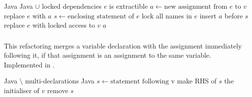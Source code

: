 \begin{algorithm}[p]
\caption{$\refactoring{Extract Assignment}(v : \type{LocalVar}, e : \type{Expr}) : \type{Assignment}$}
\label{alg:ExtractAssignment}
\begin{algorithmic}[1]
\REQUIRE Java
\ENSURE Java $\cup$ locked dependencies
\medskip
\STATE \assert $e$ is extractible
\STATE $a \leftarrow \text{new assignment from $e$ to $v$}$
  \STATE replace $e$ with $a$
\ELSE
  \STATE $s \leftarrow \text{enclosing statement of $e$}$
  \STATE lock all names in $e$
  \STATE insert $a$ before $s$
  \STATE replace $e$ with locked access to $v$
\ENDIF
\RETURN $a$
\end{algorithmic}
\end{algorithm}

\subsubsection{}
This refactoring merges a variable declaration with the assignment immediately following it, if that assignment is an assignment to the same variable. Implemented in .

\begin{algorithm}[p]
\caption{$\refactoring{Merge Variable Declaration}(v : \type{LocalVar})$}
\label{alg:MergeVariableDeclaration}
\begin{algorithmic}[1]
\REQUIRE Java $\setminus$ multi-declarations
\ENSURE Java
\medskip
{}
  \RETURN
\ENDIF
\STATE $s \leftarrow \text{statement following v}$
  \STATE make RHS of $s$ the initialiser of $v$
  \STATE remove $s$
\ENDIF
\end{algorithmic}
\end{algorithm}

